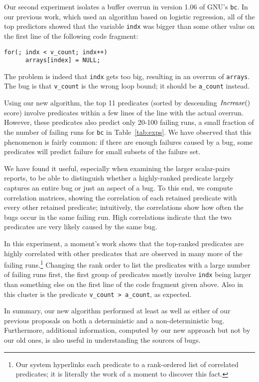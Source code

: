 Our second experiment isolates a buffer overrun in version 1.06 of GNU's {\tt bc}.  In our
previous work, which used an algorithm based on logistic regression, all of the top
predictors showed that the variable {\tt indx} was bigger than some other value on the first line of the following
code fragment:
\begin{verbatim}
for(; indx < v_count; indx++)
      arrays[index] = NULL;
\end{verbatim}
The problem is indeed that {\tt indx} gets too big, resulting in an overrun of {\tt arrays}.  The bug
is that {\tt v\_count} is the wrong loop bound; it should be {\tt a\_count} instead.  

Using our new algorithm, the top 11 predicates (sorted by descending
$\mbox{\textit{Increase}}()$ score) involve predicates within a few lines of the line
with the actual overrun.  However, these predicates also predict only
20-100 failing runs, a small fraction of the number of failing runs
for {\tt bc} in Table~\ref{tab:exps}.  We have observed that this
phenomenon is fairly common: if there are enough failures caused by a
bug, some predicates will predict failure for small subsets of the failure set.

We have found it useful, especially when examining the larger
scalar-pairs reports, to be able to distinguish whether a
highly-ranked predicate largely captures an entire bug or just an aspect of a bug.  To
this end, we compute correlation matrices, showing the correlation of
each retained predicate with every other retained predicate; intuitively, the
correlations show how often the bugs occur in the same failing run.  High correlations
indicate that the two predicates are very likely caused by the same bug.

In this experiment, a moment's work shows that the top-ranked predicates are highly
correlated with other predicates that are observed in many more of the
failing runs.\footnote{Our system hyperlinks each predicate to a
rank-ordered list of correlated predicates; it is literally the work
of a moment to discover this fact.}  Changing the rank order to list
the predicates with a large number of failing runs first, the first
group of predicates mostly involve {\tt indx} being larger than
something else on the first line of the code fragment given above.
Also in this cluster is the predicate {\tt v\_count > a\_count}, as
expected.

In summary, our new algorithm performed at least as well as either of
our previous proposals on both a deterministic and a non-deterministic
bug.     Furthermore, additional information, computed by our new
approach but not by our old ones, is also useful in understanding the
sources of bugs.







